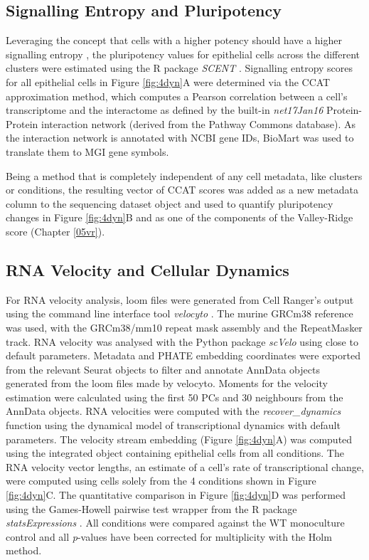 \subsection{Signalling Entropy and Pluripotency}

Leveraging the concept that cells with a higher potency should have a higher signalling entropy \cite{teschendorff_signalling_2014}, the pluripotency values for epithelial cells across the different clusters were estimated using the R package \textit{SCENT} \cite{teschendorff_single-cell_2017}. 
Signalling entropy scores for all epithelial cells in Figure \ref{fig:4dyn}A were determined via the CCAT approximation method, which computes a Pearson correlation between a cell's transcriptome and the interactome as defined by the built-in \textit{net17Jan16} Protein-Protein interaction network (derived from the Pathway Commons database). As the interaction network is annotated with NCBI gene IDs, BioMart was used to translate them to MGI gene symbols.

Being a method that is completely independent of any cell metadata, like clusters or conditions, the resulting vector of CCAT scores was added as a new metadata column to the sequencing dataset object and used to quantify pluripotency changes in Figure \ref{fig:4dyn}B and as one of the components of the Valley-Ridge score (Chapter \ref{05vr}).


\subsection{RNA Velocity and Cellular Dynamics}

For RNA velocity analysis, loom files were generated from Cell Ranger's output using the command line interface tool \textit{velocyto} \cite{la_manno_rna_2018}. The murine GRCm38 reference was used, with the GRCm38/mm10 repeat mask assembly and the RepeatMasker track. RNA velocity was analysed with the Python package \textit{scVelo} \cite{bergen_generalizing_2020} using close to default parameters. Metadata and PHATE embedding coordinates were exported from the relevant Seurat objects to filter and annotate AnnData objects generated from the loom files made by velocyto. Moments for the velocity estimation were calculated using the first 50 PCs and 30 neighbours from the AnnData objects. RNA velocities were computed with the \textit{recover\_dynamics} function using the dynamical model of transcriptional dynamics with default parameters. The velocity stream embedding (Figure \ref{fig:4dyn}A) was computed using the integrated object containing epithelial cells from all conditions. The RNA velocity vector lengths, an estimate of a cell's rate of transcriptional change, were computed using cells solely from the 4 conditions shown in Figure \ref{fig:4dyn}C. The quantitative comparison in Figure \ref{fig:4dyn}D was performed using the Games-Howell pairwise test wrapper from the R package \textit{statsExpressions} \cite{patil_statsexpressions_2021}. All conditions were compared against the WT monoculture control and all \textit{p}-values have been corrected for multiplicity with the Holm method.

